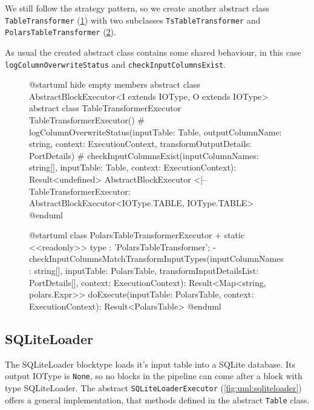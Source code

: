 We still follow the strategy pattern, so we create another abstract class \Verb|TableTransformer| (\ref{fig:uml:tabletransformer}) with two subclasses \Verb|TsTableTransformer| and \Verb|PolarsTableTransformer| (\ref{fig:uml:polarstabletransformer}).

As usual the created abstract class contains some shared behaviour, in this case \Verb|logColumnOverwriteStatus| and \Verb|checkInputColumnsExist|.

\begin{figure}
	\begin{plantuml}
		@startuml
		hide empty members
		abstract class AbstractBlockExecutor<I extends IOType, O extends IOType>
		abstract class TableTransformerExecutor {
				TableTransformerExecutor()
				# logColumnOverwriteStatus(inputTable: Table, outputColumnName: string, context: ExecutionContext, transformOutputDetails: PortDetails)
				# checkInputColumnsExist(inputColumnNames: string[], inputTable: Table, context: ExecutionContext): Result<undefined>
			}
		AbstractBlockExecutor <|-- TableTransformerExecutor: AbstractBlockExecutor<IOType.TABLE, IOType.TABLE>
		@enduml
	\end{plantuml}
	\caption{}
	\label{fig:uml:tabletransformer}
\end{figure}
\begin{figure}
	\begin{plantuml}
		@startuml
		class PolarsTableTransformerExecutor  {
		+ {static} <<readonly>> type : 'PolarsTableTransformer';
		- checkInputColumnsMatchTransformInputTypes(inputColumnNames: string[], inputTable: PolarsTable, transformInputDetailsList: PortDetails[], context: ExecutionContext): Result<Map<string, polars.Expr>>
		doExecute(inputTable: PolarsTable, context: ExecutionContext): Result<PolarsTable>
		}
		@enduml
	\end{plantuml}
	\caption{}
	\label{fig:uml:polarstabletransformer}
\end{figure}

\subsection{SQLiteLoader}
The SQLiteLoader blocktype loads it's input table into a SQLite database.
Its output IOType is \Verb|None|, so no blocks in the pipeline can come after a block with type SQLiteLoader.
The abstract \Verb|SQLiteLoaderExecutor| (\ref{fig:uml:sqliteloader}) offers a general implementation, that methods defined in the abstract \Verb|Table| class.

